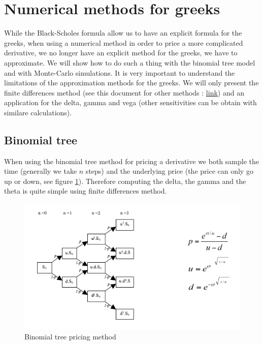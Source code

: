 \documentclass[hidelinks]{article}
\begin{document}
\newpage
\section{Numerical methods for greeks}

While the Black-Scholes formula allow us to have an explicit formula for the greeks, when using a numerical method in order to price a more complicated derivative, we no longer have an explicit method for the greeks, we have to approximate. We will show how to do such a thing with the binomial tree model and with Monte-Carlo simulations. It is very important to understand the limitations of the approximation methods for the greeks. We will only present the finite differences method (see this document for other methods : \href{http://www.xaviermilhaud.fr/public/compteRendu-grecques.pdf}{link}) and an application for the delta, gamma and vega (other sensitivities can be obtain with similare calculations).

\subsection{Binomial tree}

When using the binomial tree method for pricing a derivative we both sample the time (generally we take $n$ steps) and the underlying price (the price can only go up or down, see figure \ref{fig:binom_tree}). Therefore computing the delta, the gamma and the theta is quite simple using finite differences method.

\begin{figure}[!h]
	\centering
	\includegraphics[width=\textwidth]{binom_tree.png}
    \caption{Binomial tree pricing method}
    \label{fig:binom_tree}
    \end{figure}
    
\end{document}
